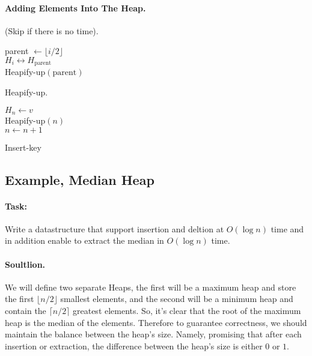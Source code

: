 \paragraph{Adding Elements Into The Heap.} (Skip if there is no time).

\begin{algorithm}
parent $\leftarrow \lfloor i/2 \rfloor $ \\
 { 
  $ H_{i} \leftrightarrow H_{\text{parent}} $ \\ 
  Heapify-up$\left( \text{parent}  \right)$
}
\caption{Heapify-up.}
\end{algorithm}


\begin{algorithm}
$ H_{n} \leftarrow v $ \\ 
Heapify-up$\left( n \right)$\\
$ n \leftarrow n + 1 $ 
\caption{Insert-key}
\end{algorithm}



\newpage 
\subsection*{Example, Median Heap}

\paragraph{Task:}Write a datastructure that support insertion and deltion at $O\left( \log n \right) $ time and in addition enable to extract the median in $O\left( \log n  \right)$ time. 

\paragraph{Soultlion.} We will define two separate Heaps, the first will be a maximum heap and store the first $ \lfloor n/2 \rfloor $ smallest elements, and the second will be a minimum heap and contain the $ \lceil n/2 \rceil$ greatest elements. So, it's clear that the root of the maximum heap is the median of the elements. Therefore to guarantee correctness, we should maintain the balance between the heap's size. Namely, promising that after each insertion or extraction, the difference between the heap's size is either $0$ or $1$.

